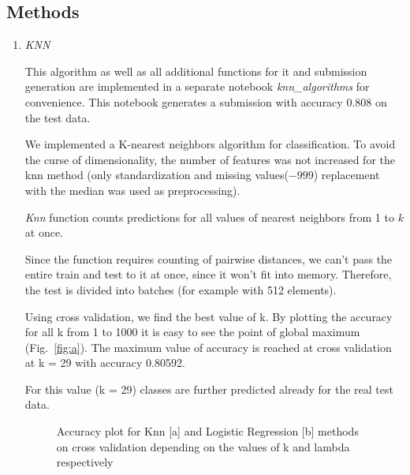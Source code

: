 \documentclass[10pt,conference,compsocconf]{IEEEtran}
\begin{document}
\subsection{Methods}
\begin{enumerate}
\item {\textit{KNN}} 

This algorithm as well as all additional functions for it and submission generation are implemented in a separate notebook \textit{knn\_algorithms} for convenience.
This notebook generates a submission with accuracy 0.808 on the test data.

We implemented a K-nearest neighbors algorithm for classification. To avoid the curse of dimensionality, the number of features was not increased for the knn method (only standardization and missing values($-999$) replacement with the median was used as preprocessing).

\textit{Knn} function counts predictions for all values of nearest neighbors from 1 to $k$ at once.

Since the function requires counting of pairwise distances, we can't pass the entire train and test to it at once, since it won't fit into memory. 
Therefore, the test is divided into batches (for example with 512 elements).

Using cross validation, we find the best value of k. By plotting the accuracy for all k from 1 to 1000 it is easy to see the point of global maximum (Fig.~\ref{fig:a}). The maximum value of accuracy is reached at cross validation at k = 29 with accuracy 0.80592.


For this value (k = 29) classes are further predicted already for the real test data.

\begin{figure}[htp] 
    \centering
    \hfill%
    \caption{Accuracy plot for Knn [a] and Logistic Regression [b] methods on cross validation depending on the values of k and lambda respectively}
\end{figure}




\end{enumerate}
\end{document}
